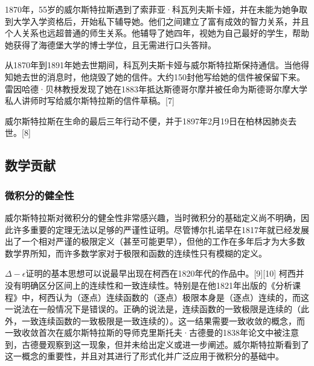 1870年，55岁的威尔斯特拉斯遇到了索菲亚·科瓦列夫斯卡娅，并在未能为她争取到大学入学资格后，开始私下辅导她。他们之间建立了富有成效的智力关系，并且个人关系也远超普通的师生关系。他辅导了她四年，视她为自己最好的学生，帮助她获得了海德堡大学的博士学位，且无需进行口头答辩。

从1870年到1891年她去世期间，科瓦列夫斯卡娅与威尔斯特拉斯保持通信。当他得知她去世的消息时，他烧毁了她的信件。大约150封他写给她的信件被保留下来。雷因哈德·贝林教授发现了她在1883年抵达斯德哥尔摩并被任命为斯德哥尔摩大学私人讲师时写给威尔斯特拉斯的信件草稿。[7]

威尔斯特拉斯在生命的最后三年行动不便，并于1897年2月19日在柏林因肺炎去世。[8]
\subsection{数学贡献}
\subsubsection{微积分的健全性}  
威尔斯特拉斯对微积分的健全性非常感兴趣，当时微积分的基础定义尚不明确，因此许多重要的定理无法以足够的严谨性证明。尽管博尔扎诺早在1817年就已经发展出了一个相对严谨的极限定义（甚至可能更早），但他的工作在多年后才为大多数数学界所知，而许多数学家对于极限和函数的连续性只有模糊的定义。

\(\Delta-\epsilon\)证明的基本思想可以说最早出现在柯西在1820年代的作品中。[9][10] 柯西并没有明确区分区间上的连续性和一致连续性。特别是在他1821年出版的《分析课程》中，柯西认为（逐点）连续函数的（逐点）极限本身是（逐点）连续的，而这一说法在一般情况下是错误的。正确的说法是，连续函数的一致极限是连续的（此外，一致连续函数的一致极限是一致连续的）。这一结果需要一致收敛的概念，而一致收敛首次在威尔斯特拉斯的导师克里斯托夫·古德曼的1838年论文中被注意到，古德曼观察到这一现象，但并未给出定义或进一步阐述。威尔斯特拉斯看到了这一概念的重要性，并且对其进行了形式化并广泛应用于微积分的基础中。